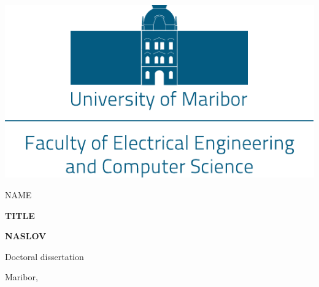 \documentclass[a4paper, twoside, 12pt]{book}
\newcommand\AUTHOR{NAME}
\newcommand\TITLE{TITLE}
\newcommand\NASLOV{NASLOV}
\newcommand\TYPE{Doctoral dissertation}
\begin{document}
\begin{titlepage}
\begin{center}
\includegraphics[scale=0.60]{img/logo-um-feri-ang.pdf}
\vspace*{\fill}

\begin{Large}
  \AUTHOR\par
\end{Large}
\vspace{10mm}

\begin{large}
  \textbf{\MakeUppercase{\TITLE}}\par
\end{large}
\vspace{10mm}

\begin{large}
  \textbf{\MakeUppercase{\NASLOV}}\par
\end{large}
\vspace{10mm}

\begin{Large}
  \TYPE\par
\end{Large}
\vspace*{\fill}

\begin{Large}
  Maribor,  
\end{Large}

\end{center}
\end{titlepage}

\newpage
\null

\newpage
{}

\newpage
\null

\frontmatter
\pagestyle{plain}
\end{document}
